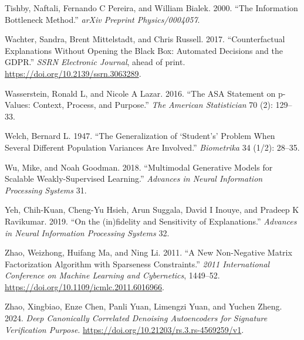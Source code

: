 \documentclass[
  letterpaper,
]{report}
\newlength{\cslhangindent}
\newenvironment{CSLReferences}[2] %
 {\begin{list}{}{%
  \setlength{\itemindent}{0pt}
  \setlength{\leftmargin}{0pt}
  \setlength{\parsep}{0pt}
  \ifodd #1
   \setlength{\leftmargin}{\cslhangindent}
   \setlength{\itemindent}{-1\cslhangindent}
  \fi
  \setlength{\itemsep}{#2\baselineskip}}}
 {\end{list}}
\begin{document}
\begin{CSLReferences}{1}{1}
Tishby, Naftali, Fernando C Pereira, and William Bialek. 2000. {``The
Information Bottleneck Method.''} \emph{arXiv Preprint Physics/0004057}.

Wachter, Sandra, Brent Mittelstadt, and Chris Russell. 2017.
{``Counterfactual Explanations Without Opening the Black Box: Automated
Decisions and the GDPR.''} \emph{SSRN Electronic Journal}, ahead of
print. \url{https://doi.org/10.2139/ssrn.3063289}.

Wasserstein, Ronald L, and Nicole A Lazar. 2016. {``The ASA Statement on
p-Values: Context, Process, and Purpose.''} \emph{The American
Statistician} 70 (2): 129--33.

Welch, Bernard L. 1947. {``The Generalization of {`Student's'} Problem
When Several Different Population Variances Are Involved.''}
\emph{Biometrika} 34 (1/2): 28--35.

Wu, Mike, and Noah Goodman. 2018. {``Multimodal Generative Models for
Scalable Weakly-Supervised Learning.''} \emph{Advances in Neural
Information Processing Systems} 31.

Yeh, Chih-Kuan, Cheng-Yu Hsieh, Arun Suggala, David I Inouye, and
Pradeep K Ravikumar. 2019. {``On the (in)fidelity and Sensitivity of
Explanations.''} \emph{Advances in Neural Information Processing
Systems} 32.

Zhao, Weizhong, Huifang Ma, and Ning Li. 2011. {``A New Non-Negative
Matrix Factorization Algorithm with Sparseness Constraints.''}
\emph{2011 International Conference on Machine Learning and
Cybernetics}, 1449--52.
\url{https://doi.org/10.1109/icmlc.2011.6016966}.

Zhao, Xingbiao, Enze Chen, Panli Yuan, Limengzi Yuan, and Yuchen Zheng.
2024. \emph{Deep Canonically Correlated Denoising Autoencoders for
Signature Verification Purpose}.
\url{https://doi.org/10.21203/rs.3.rs-4569259/v1}.

\end{CSLReferences}
\end{document}
